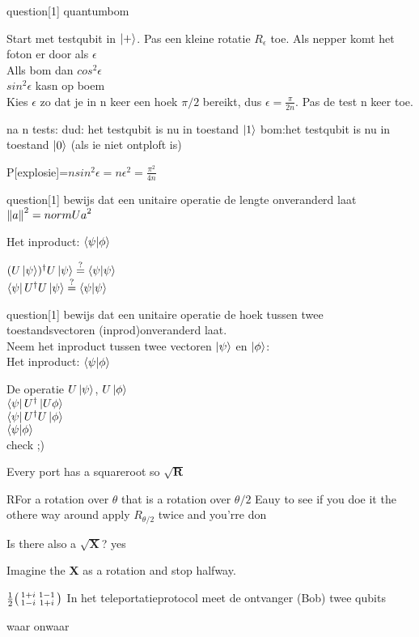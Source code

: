 \documentclass[a4paper, addpoints, 12pt
    , noanswers    %
    ]{exam}
\newcommand*{\port}[1]{\textbf{#1}}
\begin{document}
\begin{questions}
question[1]
quantumbom

Start  met testqubit in $\ket{+}$. 
Pas een kleine rotatie $R_\epsilon$ toe.
Als nepper komt het foton er door als $\epsilon$\\
Alls bom dan 
$cos^2 \epsilon$ \\
$sin^2 \epsilon$ kasn op boem\\

Kies $\epsilon$ zo dat je in n keer een hoek $\pi/2$ bereikt, dus $\epsilon=\tfrac{\pi}{2n}$. Pas de test n keer toe.

na n tests:
dud: het testqubit is nu in toestand $\ket{1}$
bom:het testqubit is nu in toestand $\ket{0}$ (als ie niet ontploft is)

P[explosie]=$n sin^2\epsilon = n\epsilon^2=\tfrac{\pi^2}{4n}$


question[1]
bewijs dat een unitaire operatie de lengte onveranderd laat
$\norm{a}^2=norm{Ua}^2$

Het inproduct: $\braket{\psi}{\phi}$

$(U\ket{\psi})^\dagger U\ket{\psi}  \overset{?}{=} \braket{\psi}{\psi}$\\
$\bra{\psi}U^\dagger U\ket{\psi}\overset{?}{=} \braket{\psi}{\psi}$

question[1]
bewijs dat een unitaire operatie de hoek tussen twee toestandsvectoren (inprod)onveranderd laat.\\
Neem het inproduct tussen twee vectoren $\ket{\psi}$ en $\ket{\phi}$:\\
Het inproduct: $\braket{\psi}{\phi}$

De operatie $U\ket{\psi}$, $U\ket{\phi}$\\
$\bra{\psi}U^\dagger\ket{U\phi}$\\
$\bra{\psi}U^\dagger U\ket{\phi}$\\
$\bra{\psi}\ket{\phi}$\\
check ;)

\question[1]
Every port has a squareroot  so $\sqrt{\port{R}}$

RFor a rotation over $\theta$ that is a rotation over $\theta/2$
Eauy to see if you doe it the othere way around apply $R_{\theta/2}$ twice and you'rre don

Is there also a $\sqrt{\port{X}}$? yes

Imagine the \port{X} as a rotation and stop halfway.

$\tfrac{1}{2}\smqty(1+i&1-1\\
1-i&1+i)
$
\question[1]
In het teleportatieprotocol meet de ontvanger (Bob) twee qubits
\begin{oneparchoices}
\choice waar
\correctchoice onwaar
\end{oneparchoices}


\end{questions}
\end{document}
